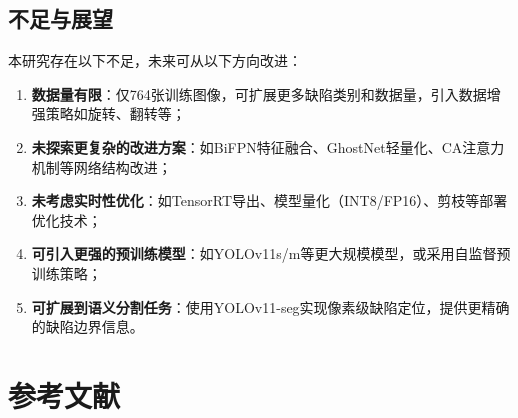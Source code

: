 \documentclass[12pt,a4paper]{article}
\begin{document}
\subsection{不足与展望}

本研究存在以下不足，未来可从以下方向改进：

\begin{enumerate}[noitemsep]
  \item \textbf{数据量有限}：仅764张训练图像，可扩展更多缺陷类别和数据量，引入数据增强策略如旋转、翻转等；
  \item \textbf{未探索更复杂的改进方案}：如BiFPN特征融合、GhostNet轻量化、CA注意力机制等网络结构改进；
  \item \textbf{未考虑实时性优化}：如TensorRT导出、模型量化（INT8/FP16）、剪枝等部署优化技术；
  \item \textbf{可引入更强的预训练模型}：如YOLOv11s/m等更大规模模型，或采用自监督预训练策略；
  \item \textbf{可扩展到语义分割任务}：使用YOLOv11-seg实现像素级缺陷定位，提供更精确的缺陷边界信息。
\end{enumerate}

\section*{参考文献}
\end{document}
